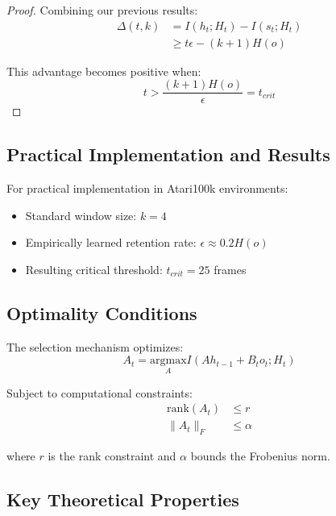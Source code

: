 \begin{proof}
Combining our previous results:
\begin{align}
    \Delta(t, k) &= I(h_t; H_t) - I(s_t; H_t) \\
    &\geq t\epsilon - (k + 1)H(o) \tag{Theorems 2 and 3}
\end{align}

This advantage becomes positive when:
\begin{equation}
    t > \frac{(k + 1)H(o)}{\epsilon} = t_{crit}
\end{equation}
\end{proof}

\subsection{Practical Implementation and Results}

For practical implementation in Atari100k environments:
\vspace{-0.5em}
\begin{itemize}
    \item Standard window size: $k = 4$ \vspace{-0.5em}
    \item Empirically learned retention rate: $\epsilon \approx 0.2H(o)$ \vspace{-0.5em}
    \item Resulting critical threshold: $t_{crit} = 25$ frames \vspace{-0.5em}
\end{itemize}

\subsection{Optimality Conditions}

The selection mechanism optimizes:
\begin{equation}
    A_t = \underset{A}{\mathrm{argmax}} I(Ah_{t-1} + B_to_t; H_t)
\end{equation}

Subject to computational constraints:
\begin{align}
    \text{rank}(A_t) &\leq r \\
    \|A_t\|_F &\leq \alpha
\end{align}

where $r$ is the rank constraint and $\alpha$ bounds the Frobenius norm.

\subsection{Key Theoretical Properties}

